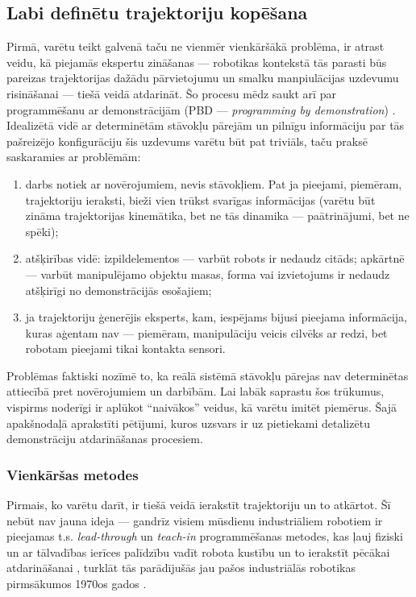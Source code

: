\documentclass[12pt, a4paper]{article}
\numberwithin{equation}{section} %
\begin{document}
\subsection{Labi definētu trajektoriju kopēšana}

Pirmā, varētu teikt galvenā taču ne vienmēr vienkāršākā problēma, ir atrast veidu, kā piejamās ekspertu zināšanas --- robotikas kontekstā tās parasti būs pareizas trajektorijas dažādu pārvietojumu un smalku manpiulācijas uzdevumu risināšanai --- tiešā veidā atdarināt. Šo procesu mēdz saukt arī par programmēšanu ar demonstrācijām (PBD --- \textit{programming by demonstration}) \cite{muench1994robot,billard2008handbook}. Idealizētā vidē ar determinētām stāvokļu pārejām un pilnīgu informāciju par tās pašreizējo konfigurāciju šis uzdevums varētu būt pat triviāls, taču praksē saskaramies ar problēmām:

\begin{enumerate}
    \item darbs notiek ar novērojumiem, nevis stāvokļiem. Pat ja pieejami, piemēram, trajektoriju ieraksti, bieži vien trūkst svarīgas informācijas (varētu būt zināma trajektorijas kinemātika, bet ne tās dinamika --- paātrinājumi, bet ne spēki);
    \item atšķirības vidē: izpildelementos --- varbūt robots ir nedaudz citāds; apkārtnē --- varbūt manipulējamo objektu masas, forma vai izvietojums ir nedaudz atšķirīgi no demonstrācijās esošajiem;
    \item ja trajektoriju ģenerējis eksperts, kam, iespējams bijusi pieejama informācija, kuras aģentam nav --- piemēram, manipulāciju veicis cilvēks ar redzi, bet robotam pieejami tikai kontakta sensori.
\end{enumerate}

Problēmas faktiski nozīmē to, ka reālā sistēmā stāvokļu pārejas nav determinētas attiecībā pret novērojumiem un darbībām. Lai labāk saprastu šos trūkumus, vispirms noderīgi ir aplūkot ``naivākos'' veidus, kā varētu imitēt piemērus. Šajā apakšnodaļā aprakstīti pētījumi, kuros uzsvars ir uz pietiekami detalizētu demonstrāciju atdarināšanas procesiem.

\subsubsection{Vienkāršas metodes}

Pirmais, ko varētu darīt, ir tiešā veidā ierakstīt trajektoriju un to atkārtot. Šī nebūt nav jauna ideja --- gandrīz visiem mūsdienu industriāliem robotiem ir pieejamas t.s. \textit{lead-through} un \textit{teach-in} programmēšanas metodes, kas ļauj fiziski un ar tālvadības ierīces palīdzību vadīt robota kustību un to ierakstīt pēcākai atdarināšanai \cite{teach_pendant}, turklāt tās parādījušās jau pašos industriālās robotikas pirmsākumos 1970os gados \cite{abb2016special}.
\end{document}
